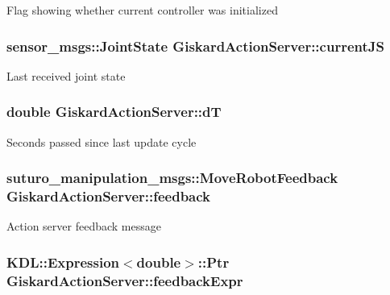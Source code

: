 Flag showing whether current controller was initialized \hypertarget{classGiskardActionServer_a06b9a0bfdf889fd886b4a10c6e0f7fe1}{
\subsubsection[{current\-J\-S}]{\setlength{\rightskip}{0pt plus 5cm}sensor\-\_\-msgs\-::\-Joint\-State Giskard\-Action\-Server\-::current\-J\-S\hspace{0.3cm}{\ttfamily [private]}}}\label{classGiskardActionServer_a06b9a0bfdf889fd886b4a10c6e0f7fe1}
Last received joint state \hypertarget{classGiskardActionServer_aca0c0257a6df8d3563fbdfdc39da1361}{
\subsubsection[{d\-T}]{\setlength{\rightskip}{0pt plus 5cm}double Giskard\-Action\-Server\-::d\-T\hspace{0.3cm}{\ttfamily [private]}}}\label{classGiskardActionServer_aca0c0257a6df8d3563fbdfdc39da1361}
Seconds passed since last update cycle \hypertarget{classGiskardActionServer_aaa0e1708f9a1af19c33986f0504e7f34}{
\subsubsection[{feedback}]{\setlength{\rightskip}{0pt plus 5cm}suturo\-\_\-manipulation\-\_\-msgs\-::\-Move\-Robot\-Feedback Giskard\-Action\-Server\-::feedback\hspace{0.3cm}{\ttfamily [private]}}}\label{classGiskardActionServer_aaa0e1708f9a1af19c33986f0504e7f34}
Action server feedback message \hypertarget{classGiskardActionServer_ae68ed4306e57da20d00e80bf38f2e4f1}{
\subsubsection[{feedback\-Expr}]{\setlength{\rightskip}{0pt plus 5cm}K\-D\-L\-::\-Expression$<$double$>$\-::Ptr Giskard\-Action\-Server\-::feedback\-Expr\hspace{0.3cm}{\ttfamily [private]}}}\label{classGiskardActionServer_ae68ed4306e57da20d00e80bf38f2e4f1}
